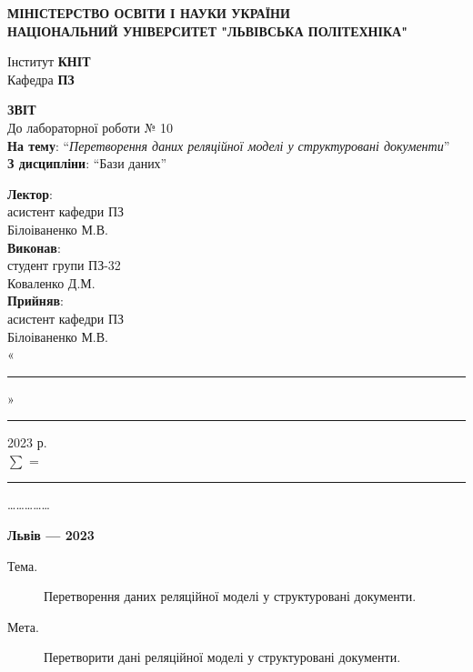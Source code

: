 \documentclass[14pt]{extreport}
\newcommand\subject{Бази даних}
\newcommand\lecturer{асистент кафедри ПЗ\\Білоіваненко М.В.}
\newcommand\teacher{асистент кафедри ПЗ\\Білоіваненко М.В.}
\newcommand\mygroup{ПЗ-32}
\newcommand\lab{10}
\newcommand\theme{Перетворення даних реляційної моделі у структуровані документи}
\newcommand\purpose{Перетворити дані реляційної моделі у структуровані документи}
\begin{document}
\begin{normalsize}
	\begin{titlepage}
		\thispagestyle{empty}
		\begin{center}
			\textbf{МІНІСТЕРСТВО ОСВІТИ І НАУКИ УКРАЇНИ\\
				НАЦІОНАЛЬНИЙ УНІВЕРСИТЕТ "ЛЬВІВСЬКА ПОЛІТЕХНІКА"}
		\end{center}
		\begin{flushright}
			Інститут \textbf{КНІТ}\\
			Кафедра \textbf{ПЗ}
		\end{flushright}
		\vspace{200pt}
		\begin{center}
			\textbf{ЗВІТ}\\
			\vspace{10pt}
			До лабораторної роботи № \lab\\
			\textbf{На тему}: “\textit{\theme}”\\
			\textbf{З дисципліни}: “\subject”
		\end{center}
		\vspace{40pt}
		\begin{flushright}
			
			\textbf{Лектор}:\\
			\lecturer\\
			\vspace{10pt}
			\textbf{Виконав}:\\
			
			студент групи \mygroup\\
			Коваленко Д.М.\\
			\vspace{10pt}
			\textbf{Прийняв}:\\
			
			\teacher\\
			
			\vspace{28pt}
			«\rule{1cm}{0.15mm}» \rule{1.5cm}{0.15mm} 2023 р.\\
			$\sum$ = \rule{1cm}{0.15mm}……………\\
			
		\end{flushright}
		\vspace{\fill}
		\begin{center}
			\textbf{Львів — 2023}
		\end{center}
	\end{titlepage}
		
	\begin{description}
		\item[Тема.] \theme.
		\item[Мета.] \purpose.
	\end{description}


\end{normalsize}
\end{document}
